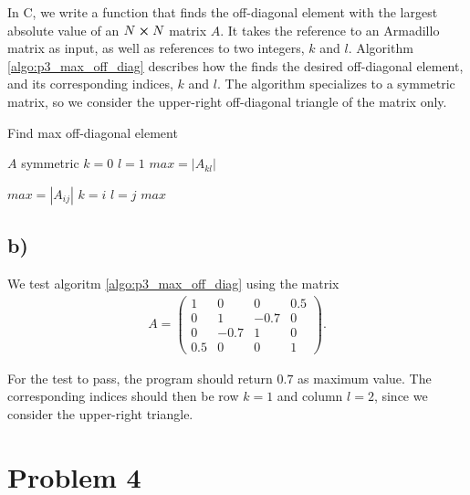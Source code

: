 \documentclass[english,notitlepage,nofootinbib]{revtex4-1}  %
\newcommand{\CC}{C\nolinebreak\hspace{-.05em}\raisebox{.4ex}{\tiny\bf +}\nolinebreak\hspace{-.10em}\raisebox{.4ex}{\tiny\bf +}}
\begin{document}
In \CC, we write a function that finds the off-diagonal element with the largest absolute value of an $N\cross N$ matrix $A$. It takes the reference to an Armadillo matrix as input, as well as references to two integers, $k$ and $l$. Algorithm \ref{algo:p3_max_off_diag} describes how the finds the desired off-diagonal element, and its corresponding indices, $k$ and $l$. The algorithm specializes to a symmetric matrix, so we consider the upper-right off-diagonal triangle of the matrix only.  

\begin{algorithm}[H]
\caption{Find max off-diagonal element}\label{algo:p3_max_off_diag}
    \begin{algorithmic}
        \Require $A$ symmetric
        \State $k=0$
        \State $l=1$
        \State $max = |A_{kl}|$ 
    
                \State $max = |A_{ij}|$
                \State $k=i$
                \State $l=j$
            \EndIf
        \EndFor
        \Return $max$
    \end{algorithmic}
\end{algorithm}

\subsection*{b)}

We test algoritm \ref{algo:p3_max_off_diag} using the matrix 
\begin{align*}
    A=\begin{pmatrix}
        1 & 0 & 0 & 0.5 \\
        0 & 1 & -0.7 & 0 \\
        0 & -0.7 & 1 & 0 \\
        0.5 & 0 & 0 & 1
    \end{pmatrix}.
\end{align*}

For the test to pass, the program should return $0.7$ as maximum value. The corresponding indices should then be row $k=1$ and column $l=2$, since we consider the upper-right triangle. 


\section*{Problem 4}
\end{document}
